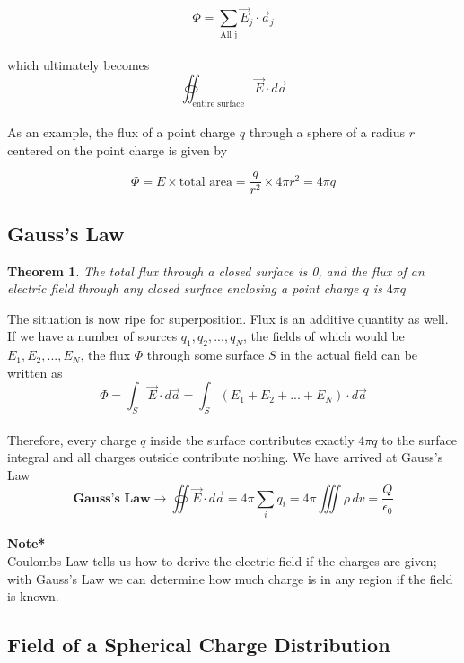 \documentclass[svgnames]{article}
\newtheorem{theorem}{Theorem}		%
\begin{document}
\[ \Phi = \sum_{\text{All j}} \vec{E}_j \cdot \vec{a}_j \] \\

which ultimately becomes \\ 

\[ \oiint_\text{entire surface} \vec{E} \cdot d\vec{a} \] \\ 

As an example, the flux of a point charge $q$ through a sphere of a radius $r$
centered on the point charge is given by

\[ \Phi = E \times \text{total area} = \frac{q}{r^2} \times 4\pi r^2 = 4\pi q \] 

\subsection{Gauss's Law} 

\begin{theorem}
The total flux through a closed surface is 0, and the flux of an electric field
through \textit{any} closed surface enclosing a point charge $q$ is $4\pi q$ 
\end{theorem} 

The situation is now ripe for superposition. Flux is an additive quantity as
well. If we have a number of sources $q_1,q_2,...,q_N$, the fields of which
would be $E_1,E_2,...,E_N$, the flux $\Phi$ through some surface $S$ in the actual field can be written as \\

\[ \Phi = \int_S \vec{E} \cdot d\vec{a} = \int_S (E_1 + E_2 + ... + E_N) \cdot d\vec{a} \] \\

Therefore, every charge $q$ inside the surface contributes exactly $4\pi q$ to
the surface integral and all charges outside contribute nothing. We have arrived at Gauss's Law \\ 

\[ \textbf{Gauss's Law} \rightarrow  \oiint \vec{E} \cdot d\vec{a} = 4\pi
\sum_i q_i = 4\pi \iiint \rho \, dv =  \frac{Q}{\epsilon_0} \] \\ 


\textbf{Note*} \\

Coulombs Law tells us how to derive the electric field if the charges are
given; with Gauss's Law we can determine how much charge is in any region if the field is known. 

\subsection{Field of a Spherical Charge Distribution} 
\end{document}

